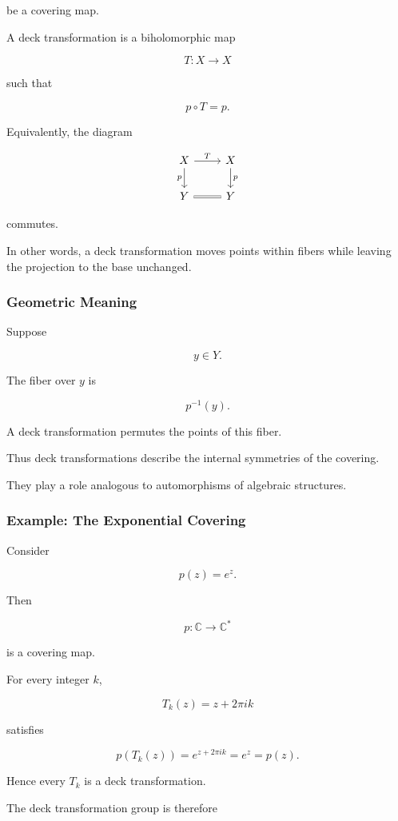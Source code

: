 \documentclass[12pt,a4paper]{article}
\theoremstyle{notespace}
\begin{document}
be a covering map.

A deck transformation is a biholomorphic map

\[
T:X\to X
\]

such that

\[
p\circ T=p.
\]

Equivalently, the diagram

\[
\begin{tikzcd}
	X \arrow[r,"T"] \arrow[d,"p"']
	&
	X \arrow[d,"p"]
	\\
	Y \arrow[r,equal]
	&
	Y
\end{tikzcd}
\]

commutes.

In other words, a deck transformation moves points within fibers while leaving the projection to the base unchanged.

\subsubsection{Geometric Meaning}

Suppose

\[
y\in Y.
\]

The fiber over \(y\) is

\[
p^{-1}(y).
\]

A deck transformation permutes the points of this fiber.

Thus deck transformations describe the internal symmetries of the covering.

They play a role analogous to automorphisms of algebraic structures.

\subsubsection{Example: The Exponential Covering}

Consider

\[
p(z)=e^z.
\]

Then

\[
p:\mathbb C\to\mathbb C^*
\]

is a covering map.

For every integer \(k\),

\[
T_k(z)=z+2\pi i k
\]

satisfies

\[
p(T_k(z))
=
e^{z+2\pi i k}
=
e^z
=
p(z).
\]

Hence every \(T_k\) is a deck transformation.

The deck transformation group is therefore
\end{document}
